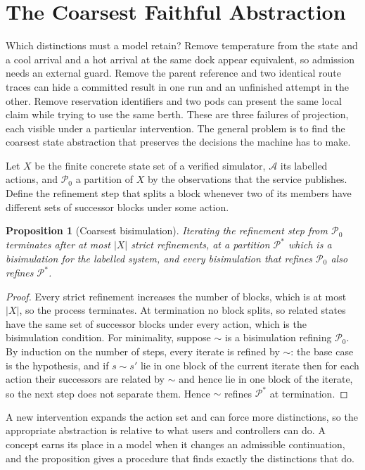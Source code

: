 \documentclass[11pt,openany]{book}
\theoremstyle{plain}
\newtheorem{proposition}[theorem]{Proposition}
\theoremstyle{definition}
\theoremstyle{remark}
\begin{document}
\section{The Coarsest Faithful Abstraction}

Which distinctions must a model retain? Remove temperature from the state and a cool arrival and a hot arrival at the same dock appear equivalent, so admission needs an external guard. Remove the parent reference and two identical route traces can hide a committed result in one run and an unfinished attempt in the other. Remove reservation identifiers and two pods can present the same local claim while trying to use the same berth. These are three failures of projection, each visible under a particular intervention. The general problem is to find the coarsest state abstraction that preserves the decisions the machine has to make.

Let $X$ be the finite concrete state set of a verified simulator, $\mathcal A$ its labelled actions, and $\mathcal P_0$ a partition of $X$ by the observations that the service publishes. Define the refinement step that splits a block whenever two of its members have different sets of successor blocks under some action.

\begin{proposition}[Coarsest bisimulation]
\label{prop:refine}
Iterating the refinement step from $\mathcal P_0$ terminates after at most $|X|$ strict refinements, at a partition $\mathcal P^*$ which is a bisimulation for the labelled system, and every bisimulation that refines $\mathcal P_0$ also refines $\mathcal P^*$.
\end{proposition}
\begin{proof}
Every strict refinement increases the number of blocks, which is at most $|X|$, so the process terminates. At termination no block splits, so related states have the same set of successor blocks under every action, which is the bisimulation condition. For minimality, suppose $\sim$ is a bisimulation refining $\mathcal P_0$. By induction on the number of steps, every iterate is refined by $\sim$: the base case is the hypothesis, and if $s\sim s'$ lie in one block of the current iterate then for each action their successors are related by $\sim$ and hence lie in one block of the iterate, so the next step does not separate them. Hence $\sim$ refines $\mathcal P^*$ at termination.
\end{proof}

A new intervention expands the action set and can force more distinctions, so the appropriate abstraction is relative to what users and controllers can do. A concept earns its place in a model when it changes an admissible continuation, and the proposition gives a procedure that finds exactly the distinctions that do.
\end{document}
